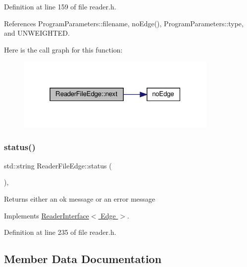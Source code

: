 Definition at line 159 of file reader.\+h.



References Program\+Parameters\+::filename, no\+Edge(), Program\+Parameters\+::type, and U\+N\+W\+E\+I\+G\+H\+T\+ED.

Here is the call graph for this function\+:\nopagebreak
\begin{figure}[H]
\begin{center}
\leavevmode
\includegraphics[width=277pt]{classReaderFileEdge_a97f967287fdf7f4804139ba9d123494c_cgraph}
\end{center}
\end{figure}
\mbox{\label{classReaderFileEdge_a05205d129f4f59c5cbd4e7a2dcb3d0c1}} 
\subsubsection{\texorpdfstring{status()}{status()}}
{\footnotesize\ttfamily std\+::string Reader\+File\+Edge\+::status (\begin{DoxyParamCaption}{ }\end{DoxyParamCaption})\hspace{0.3cm}{\ttfamily [inline]}, {\ttfamily [virtual]}}

\begin{DoxyReturn}{Returns}
either an ok message or an error message 
\end{DoxyReturn}


Implements \hyperlink{classReaderInterface_a5f86ed49eac808ed0a912f7d670c4042}{Reader\+Interface$<$ Edge $>$}.



Definition at line 235 of file reader.\+h.



\subsection{Member Data Documentation}
\mbox{\label{classReaderFileEdge_a0880f77cf8a5d28e6cea35e30abb3388}} 
